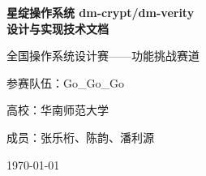 \documentclass[12pt,a4paper]{report}
\begin{document}
\begin{titlepage}
    \centering
    \vspace*{2cm}
    {\Huge\bfseries 星绽操作系统 dm-crypt/dm-verity\\[0.5cm]
    设计与实现技术文档\par}
    \vspace{1cm}
    {\Large 全国操作系统设计赛——功能挑战赛道\par}
    \vspace{1.5cm}
    {\large 参赛队伍：Go\_Go\_Go\par}
    {\large 高校：华南师范大学\par}
    {\large 成员：张乐桁、陈韵、潘利源\par}
    \vspace{1cm}
    {\large \today\par}  %
\end{titlepage}

\tableofcontents
\clearpage











\appendix





\end{document}
